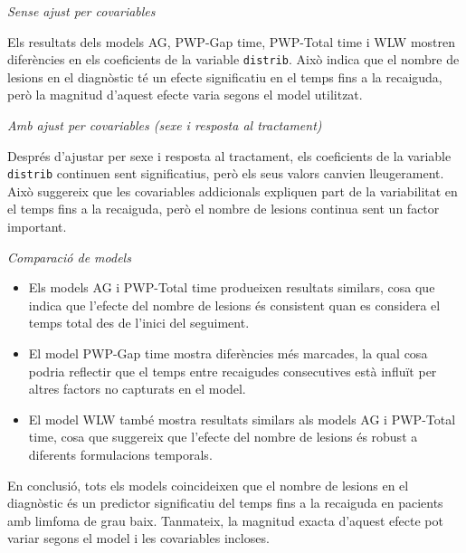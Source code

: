 \documentclass[
]{article}
\begin{document}
\emph{Sense ajust per covariables}

Els resultats dels models AG, PWP-Gap time, PWP-Total time i WLW mostren
diferències en els coeficients de la variable \texttt{distrib}. Això
indica que el nombre de lesions en el diagnòstic té un efecte
significatiu en el temps fins a la recaiguda, però la magnitud d'aquest
efecte varia segons el model utilitzat.

\emph{Amb ajust per covariables (sexe i resposta al tractament)}

Després d'ajustar per sexe i resposta al tractament, els coeficients de
la variable \texttt{distrib} continuen sent significatius, però els seus
valors canvien lleugerament. Això suggereix que les covariables
addicionals expliquen part de la variabilitat en el temps fins a la
recaiguda, però el nombre de lesions continua sent un factor important.

\emph{Comparació de models}

\begin{itemize}
\item
  Els models AG i PWP-Total time produeixen resultats similars, cosa que
  indica que l'efecte del nombre de lesions és consistent quan es
  considera el temps total des de l'inici del seguiment.
\item
  El model PWP-Gap time mostra diferències més marcades, la qual cosa
  podria reflectir que el temps entre recaigudes consecutives està
  influït per altres factors no capturats en el model.
\item
  El model WLW també mostra resultats similars als models AG i PWP-Total
  time, cosa que suggereix que l'efecte del nombre de lesions és robust
  a diferents formulacions temporals.
\end{itemize}

En conclusió, tots els models coincideixen que el nombre de lesions en
el diagnòstic és un predictor significatiu del temps fins a la recaiguda
en pacients amb limfoma de grau baix. Tanmateix, la magnitud exacta
d'aquest efecte pot variar segons el model i les covariables incloses.
\end{document}
